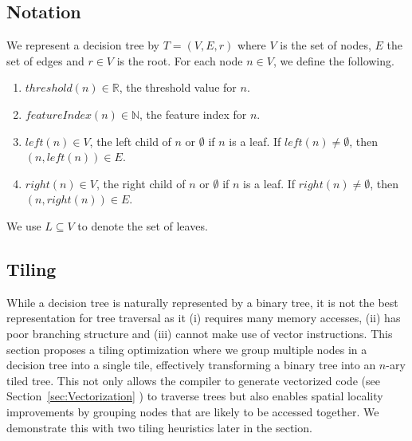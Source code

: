 \subsection{Notation}
We represent a decision tree by $T = (V, E, r)$ where $V$ is the set of nodes, $E$ the set of edges and
$r \in V$ is the root. For each node $n \in V$, we define the following.
\begin{enumerate}
    \item $threshold(n) \in \mathbb{R}$, the threshold value for $n$.
    \item $featureIndex(n) \in \mathbb{N}$, the feature index for $n$.
    \item $left(n) \in V$, the left child of $n$ or $\emptyset$ if $n$ is a leaf. If $left(n) \neq \emptyset$, then $(n, left(n)) \in E$.
    \item $right(n) \in V$, the right child of $n$ or $\emptyset$ if $n$ is a leaf. If $right(n) \neq \emptyset$, then $(n, right(n)) \in E$.
\end{enumerate}
We use $L \subseteq V$ to denote the set of leaves. %

\subsection{Tiling}
\label{sec:Tiling}

While a decision tree is naturally represented by a binary tree, 
it is not the best representation for tree traversal as it (i) requires many memory accesses, 
(ii) has poor branching structure and (iii) cannot make use of vector instructions. 
This section proposes a tiling optimization where we group multiple nodes in a decision tree into a single tile, effectively transforming a binary tree into an $n$-ary tiled tree. This not only allows the compiler to generate vectorized code (see Section~\ref{sec:Vectorization} ) to traverse trees but also enables spatial locality improvements by grouping nodes that are likely to be accessed together. We demonstrate this with two tiling heuristics later in the section. 



